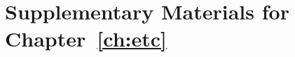 \chapter{Supplementary Materials for \texorpdfstring{Chapter~\ref{ch:etc}}{Chapter 4}}\label{app:etc}

